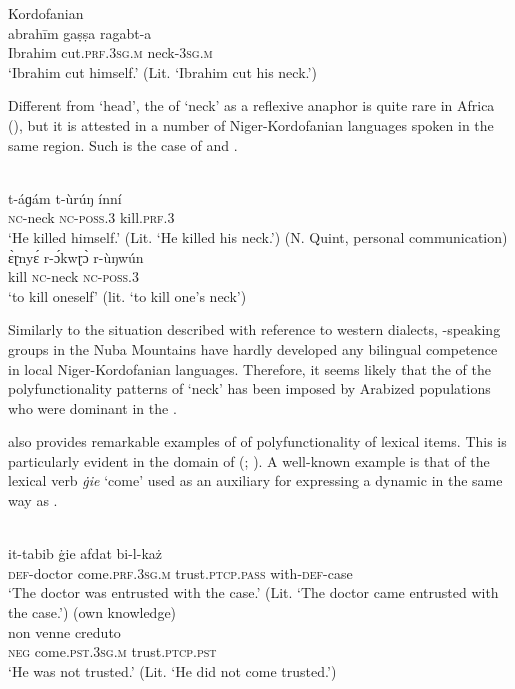 \documentclass[output=paper]{langsci/langscibook}
\begin{document}
\ea\label{20}
{Kordofanian   \citep[176]{Manfredi2010}}\\
\gll  abrahīm gaṣṣa ragabt-a\\
       Ibrahim cut.\textsc{prf.3sg.m} neck-\textsc{3sg.m}\\
\glt   `Ibrahim cut himself.' (Lit. `Ibrahim cut his neck.')
\z

Different from ‘head’, the  of ‘neck’ as a reflexive anaphor is quite rare in Africa (\citealt[50]{Heine2011}), but it is attested in a number of Niger-Kordofanian languages spoken in the same region. Such is the case of   and  . 

\ea\label{21}
{ \citep[26]{Alamin2015}}\\
\gll   t-áɡám t-ùrúŋ ínní\\
       \textsc{nc}-neck \textsc{nc}-\textsc{poss.3} kill.\textsc{prf.3}\\
\glt   `He killed himself.' (Lit. ‘He killed his neck.’)
\ex\label{22}
{ (N. Quint, personal communication)} \\
\gll   ɛ̀ɽnyɛ́ r-ɔ́kwɽɔ̀ r-ùŋwún\\
       kill \textsc{nc}-neck \textsc{nc-poss.3}\\
\glt   `to kill oneself' (lit. ‘to kill one's neck’)
\z

Similarly to the situation described with reference to western  dialects, -speaking groups in the Nuba Mountains have hardly developed any bilingual competence in local Niger-Kordofanian languages. Therefore, it seems likely that the  of the polyfunctionality patterns of ‘neck’ has been imposed by Arabized populations who were dominant in the . 

 also provides remarkable examples of  of polyfunctionality of lexical items. This is particularly evident in the domain of  (\citealt{Vanhove1993}; \citealt{VanhoveCaubet2009}). A well-known example is that of the lexical verb \textit{\.gie} ‘come’ used as an auxiliary for expressing a dynamic   in the same way as  .

\ea\label{23}
{ \citep[214]{BorgAzzopardi-Alexander1997}}\\
\gll   it-tabib \.gie afdat bi-l-każ\\
       \textsc{def}-doctor come.\textsc{prf.3sg.m} trust.\textsc{ptcp.pass} with-\textsc{def}-case\\
\glt   `The doctor was entrusted with the case.' (Lit. ‘The doctor came entrusted with the case.’)
\ex \label{24}
{ (own knowledge)} \\
\gll   non venne creduto\\
       \textsc{neg} come.\textsc{pst.3sg.m} trust.\textsc{ptcp.pst}\\
\glt   `He was not trusted.' (Lit. ‘He did not come trusted.’)
\z
\end{document}
